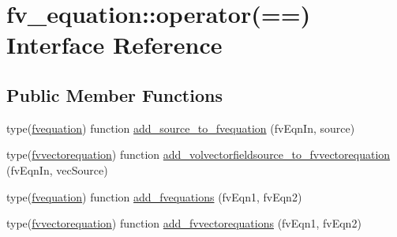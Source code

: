 \hypertarget{interfacefv__equation_1_1operator_07_0A_0A_08}{\section{fv\-\_\-equation\-:\-:operator(==) Interface Reference}
\label{interfacefv__equation_1_1operator_07_0A_0A_08}
}
\subsection*{Public Member Functions}
\begin{DoxyCompactItemize}
\item 
type(\hyperlink{structfv__equation_1_1fvequation}{fvequation}) function \hyperlink{interfacefv__equation_1_1operator_07_0A_0A_08_ac7bf47eacc6c5de6802d2fbf6b71fb63}{add\-\_\-source\-\_\-to\-\_\-fvequation} (fv\-Eqn\-In, source)
\item 
type(\hyperlink{structfv__equation_1_1fvvectorequation}{fvvectorequation}) function \hyperlink{interfacefv__equation_1_1operator_07_0A_0A_08_ace075aa4a59a82a5eed335937025a341}{add\-\_\-volvectorfieldsource\-\_\-to\-\_\-fvvectorequation} (fv\-Eqn\-In, vec\-Source)
\item 
type(\hyperlink{structfv__equation_1_1fvequation}{fvequation}) function \hyperlink{interfacefv__equation_1_1operator_07_0A_0A_08_ae1f07d9167f57b85dda4cd753e76ca66}{add\-\_\-fvequations} (fv\-Eqn1, fv\-Eqn2)
\item 
type(\hyperlink{structfv__equation_1_1fvvectorequation}{fvvectorequation}) function \hyperlink{interfacefv__equation_1_1operator_07_0A_0A_08_ac4589656d40d821719fe6a055099e86d}{add\-\_\-fvvectorequations} (fv\-Eqn1, fv\-Eqn2)
\end{DoxyCompactItemize}


